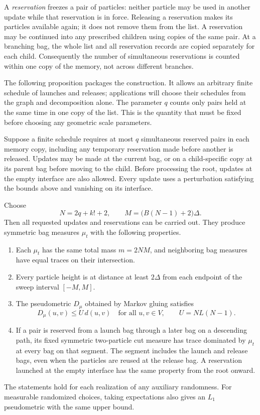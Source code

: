 A \emph{reservation} freezes a pair of particles: neither particle may
be used in another update while that reservation is in force.  Releasing
a reservation makes its particles available again; it does not remove
them from the list.  A reservation may be continued into any prescribed
children using copies of the same pair.  At a branching bag, the whole
list and all reservation records are copied separately for each child.
Consequently the number of simultaneous reservations is counted within
one copy of the memory, not across different branches.

The following proposition packages the construction.  It allows an
arbitrary finite schedule of launches and releases; applications will
choose their schedules from the graph and decomposition alone.
The parameter $q$ counts only pairs held at the same time in one copy
of the list.  This is the quantity that must be fixed before choosing
any geometric scale parameters.

\begin{proposition}
\label{prop:particle-realization}
Suppose a finite schedule requires at most $q$ simultaneous reserved
pairs in each memory copy, including any temporary reservation made
before another is released.  Updates may be made at the current bag, or
on a child-specific copy at its parent bag before moving to the child.
Before processing the root, updates at the empty interface are also
allowed.  Every update uses a perturbation satisfying the bounds above
and vanishing on its interface.

Choose
\[
 N=2q+k!+2,
 \qquad
 M=\bigl(B(N-1)+2\bigr)\Delta.
\]
Then all requested updates and reservations can be carried out.  They
produce symmetric bag measures $\mu_t$ with the following properties.
\begin{enumerate}
\item Each $\mu_t$ has the same total mass $m=2NM$, and neighboring bag
measures have equal traces on their intersection.
\item Every particle height is at distance at least $2\Delta$ from each
endpoint of the sweep interval $[-M,M]$.
\item The pseudometric $D_\mu$ obtained by Markov gluing satisfies
\[
 D_\mu(u,v)\le U\,d(u,v)
 \quad\text{for all }u,v\in V,
 \qquad U=NL(N-1).
\]
\item If a pair is reserved from a launch bag through a later bag on a
descending path, its fixed symmetric two-particle cut measure has trace
dominated by $\mu_t$ at every bag on that segment.  The segment includes
the launch and release bags, even when the particles are reused at the
release bag.  A reservation launched at the empty interface has the same
property from the root onward.
\end{enumerate}
The statements hold for each realization of any auxiliary randomness.
For measurable randomized choices, taking expectations also gives an
$L_1$ pseudometric with the same upper bound.
\end{proposition}

